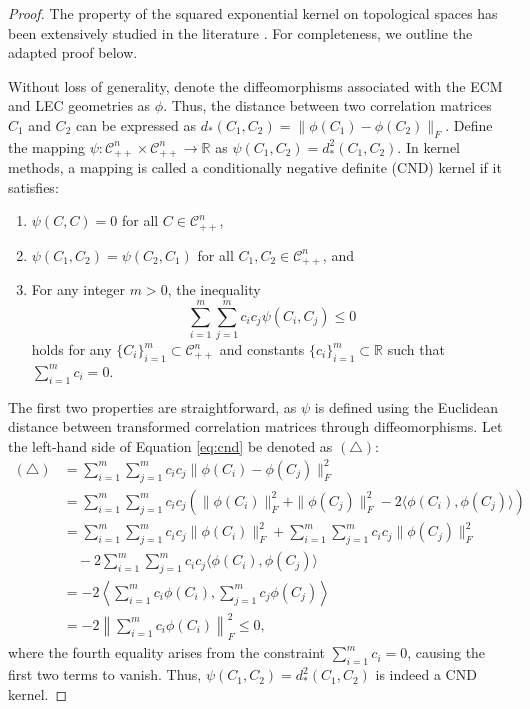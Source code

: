 \documentclass[10pt]{article}
\newcommand{\CORR}{\mathcal{C}_{++}^n}
\begin{document}
\begin{proof}
	The property of the squared exponential kernel on topological spaces has been extensively studied in the literature \citep{berg_1984_HarmonicAnalysisSemigroups, klebanov_2005_NdistancesTheirApplications, feragen_2015_GeodesicExponentialKernels, jayasumana_2015_KernelMethodsRiemannian}. For completeness, we outline the adapted proof below.
	
	Without loss of generality, denote the diffeomorphisms associated with the ECM and LEC geometries as $\phi$. Thus, the distance between two correlation matrices $C_1$ and $C_2$ can be expressed as $d_*(C_1, C_2) = \|\phi(C_1) - \phi(C_2)\|_F$. Define the mapping $\psi : \CORR \times \CORR \rightarrow \mathbb{R}$ as $\psi(C_1, C_2) = d_*^2(C_1, C_2)$. In kernel methods, a mapping is called a conditionally negative definite (CND) kernel if it satisfies:
	\begin{enumerate}
		\item $\psi(C, C) = 0$ for all $C \in \CORR$,
		\item $\psi(C_1, C_2) = \psi(C_2, C_1)$ for all $C_1, C_2 \in \CORR$, and
		\item For any integer $m > 0$, the inequality 
		\begin{equation}\label{eq:cnd}
			\sum_{i=1}^m \sum_{j=1}^m c_i c_j \psi(C_i, C_j) \leq 0
		\end{equation}
		holds for any $\lbrace C_i \rbrace_{i=1}^m \subset \CORR$ and constants $\lbrace c_i \rbrace_{i=1}^m \subset \mathbb{R}$ such that $\sum_{i=1}^m c_i = 0$.
	\end{enumerate}
	
	The first two properties are straightforward, as $\psi$ is defined using the Euclidean distance between transformed correlation matrices through diffeomorphisms. Let the left-hand side of Equation \eqref{eq:cnd} be denoted as $(\triangle)$:
	\begin{align*}
		(\triangle) &= \sum_{i=1}^m \sum_{j=1}^m c_i c_j \|\phi(C_i) - \phi(C_j)\|_F^2 \\ 
		&= \sum_{i=1}^m \sum_{j=1}^m c_i c_j \left( \|\phi(C_i)\|_F^2 + \|\phi(C_j)\|_F^2 - 2\langle \phi(C_i), \phi(C_j) \rangle \right) \\
		&= \sum_{i=1}^m \sum_{j=1}^m c_i c_j \|\phi(C_i)\|_F^2 + \sum_{i=1}^m \sum_{j=1}^m c_i c_j \|\phi(C_j)\|_F^2 \\
		&\quad - 2 \sum_{i=1}^m \sum_{j=1}^m c_i c_j \langle \phi(C_i), \phi(C_j) \rangle \\
		&= -2 \left\langle \sum_{i=1}^m c_i \phi(C_i), \sum_{j=1}^m c_j \phi(C_j) \right\rangle \\ 
		&= -2 \left\| \sum_{i=1}^m c_i \phi(C_i) \right\|_F^2 \leq 0,
	\end{align*}
	where the fourth equality arises from the constraint $\sum_{i=1}^m c_i = 0$, causing the first two terms to vanish. Thus, $\psi(C_1, C_2) = d_*^2(C_1, C_2)$ is indeed a CND kernel.
	

\end{proof}
\end{document}
